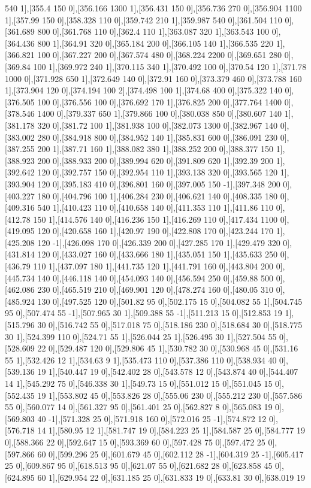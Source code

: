 {540 1],[355.4 150 0],[356.166 1300 1],[356.431 150 0],[356.736 270 0],[356.904 1100 1],[357.99 150 0],[358.328 110 0],[359.742 210 1],[359.987 540 0],[361.504 110 0],[361.689 800 0],[361.768 110 0],[362.4 110 1],[363.087 320 1],[363.543 100 0],[364.436 800 1],[364.91 320 0],[365.184 200 0],[366.105 140 1],[366.535 220 1],[366.821 100 0],[367.227 200 0],[367.574 480 0],[368.224 2200 0],[369.651 280 0],[369.84 100 1],[369.972 240 1],[370.115 340 1],[370.492 100 0],[370.54 120 1],[371.78 1000 0],[371.928 650 1],[372.649 140 0],[372.91 160 0],[373.379 460 0],[373.788 160 1],[373.904 120 0],[374.194 100 2],[374.498 100 1],[374.68 400 0],[375.322 140 0],[376.505 100 0],[376.556 100 0],[376.692 170 1],[376.825 200 0],[377.764 1400 0],[378.546 1400 0],[379.337 650 1],[379.866 100 0],[380.038 850 0],[380.607 140 1],[381.178 320 0],[381.72 100 1],[381.938 100 0],[382.073 1300 0],[382.967 140 0],[383.002 280 0],[384.918 800 0],[384.952 140 1],[385.831 600 0],[386.091 230 0],[387.255 200 1],[387.71 160 1],[388.082 380 1],[388.252 200 0],[388.377 150 1],[388.923 200 0],[388.933 200 0],[389.994 620 0],[391.809 620 1],[392.39 200 1],[392.642 120 0],[392.757 150 0],[392.954 110 1],[393.138 320 0],[393.565 120 1],[393.904 120 0],[395.183 410 0],[396.801 160 0],[397.005 150 -1],[397.348 200 0],[403.227 180 0],[404.796 100 1],[406.284 230 0],[406.621 140 0],[408.335 180 0],[409.316 540 1],[410.423 110 0],[410.658 140 0],[411.353 110 1],[411.86 110 0],[412.78 150 1],[414.576 140 0],[416.236 150 1],[416.269 110 0],[417.434 1100 0],[419.095 120 0],[420.658 160 1],[420.97 190 0],[422.808 170 0],[423.244 170 1],[425.208 120 -1],[426.098 170 0],[426.339 200 0],[427.285 170 1],[429.479 320 0],[431.814 120 0],[433.027 160 0],[433.666 180 1],[435.051 150 1],[435.633 250 0],[436.79 110 1],[437.097 180 1],[441.735 120 1],[441.791 160 0],[443.804 200 0],[445.734 140 0],[446.118 140 0],[454.093 140 0],[456.594 250 0],[459.88 500 0],[462.086 230 0],[465.519 210 0],[469.901 120 0],[478.274 160 0],[480.05 310 0],[485.924 130 0],[497.525 120 0],[501.82 95 0],[502.175 15 0],[504.082 55 1],[504.745 95 0],[507.474 55 -1],[507.965 30 1],[509.388 55 -1],[511.213 15 0],[512.853 19 1],[515.796 30 0],[516.742 55 0],[517.018 75 0],[518.186 230 0],[518.684 30 0],[518.775 30 1],[524.399 110 0],[524.71 55 1],[526.044 25 1],[526.495 30 1],[527.504 55 0],[528.609 22 0],[529.487 120 0],[529.806 45 1],[530.782 30 0],[530.968 45 0],[531.16 55 1],[532.426 12 1],[534.63 9 1],[535.473 110 0],[537.386 110 0],[538.934 40 0],[539.136 19 1],[540.447 19 0],[542.402 28 0],[543.578 12 0],[543.874 40 0],[544.407 14 1],[545.292 75 0],[546.338 30 1],[549.73 15 0],[551.012 15 0],[551.045 15 0],[552.435 19 1],[553.802 45 0],[553.826 28 0],[555.06 230 0],[555.212 230 0],[557.586 55 0],[560.077 14 0],[561.327 95 0],[561.401 25 0],[562.827 8 0],[565.083 19 0],[569.803 40 -1],[571.328 25 0],[571.918 160 0],[572.016 25 -1],[574.872 12 0],[576.718 14 1],[580.95 12 1],[581.747 19 0],[584.223 25 1],[584.587 25 0],[584.777 19 0],[588.366 22 0],[592.647 15 0],[593.369 60 0],[597.428 75 0],[597.472 25 0],[597.866 60 0],[599.296 25 0],[601.679 45 0],[602.112 28 -1],[604.319 25 -1],[605.417 25 0],[609.867 95 0],[618.513 95 0],[621.07 55 0],[621.682 28 0],[623.858 45 0],[624.895 60 1],[629.954 22 0],[631.185 25 0],[631.833 19 0],[633.81 30 0],[638.019 19 }
